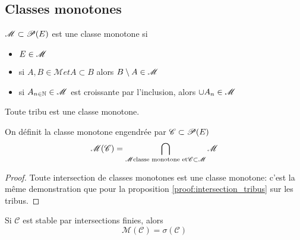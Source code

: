 \subsection{Classes monotones}

\begin{definition}
	$\mathscr{M} \subset \mathscr{P}(E)$ est une classe monotone si
	\begin{itemize}
		\item $E\in \mathscr{M}$
		\item si $A,B \in \mathscr{M} et A \subset B$ alors $B\setminus A \in \mathscr{M}$
		\item si $A_{n\in\mathbb{N}} \in \mathscr{M}$ est croissante par l'inclusion, alors $\cup A_n \in \mathscr{M}$
	\end{itemize}
\end{definition}

\begin{remarque}
	Toute tribu est une classe monotone.
\end{remarque}

\begin{definition}
	On définit la classe monotone engendrée par $\mathscr{C} \subset \mathscr{P}(E)$
	$$ \mathscr{M}(\mathscr{C}) = \bigcap\limits_{\mathscr{M} \text{classe monotone et} \mathscr{C} \subset \mathscr{M}} \mathscr{M} $$
\end{definition}

\begin{proof}
	Toute intersection de classes monotones est une classe monotone: c'est la même demonstration que pour la proposition \ref{proof:intersection_tribus} sur les tribus.
\end{proof}

\begin{theorem}
	Si $\mathscr{C}$ est stable par intersections finies, alors
	$$ \mathscr{M}(\mathscr{C}) = \sigma(\mathscr{C}) $$
\end{theorem}


